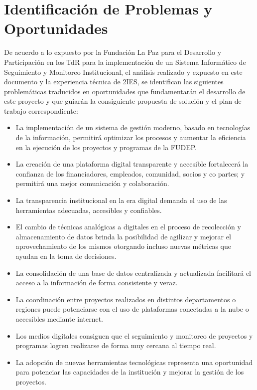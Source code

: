 \section{Identificación de Problemas y Oportunidades}

De acuerdo a lo expuesto por la Fundación La Paz para el Desarrollo y Participación en los TdR para la implementación de un Sistema Informático de Seguimiento y Monitoreo Institucional,
el análisis realizado y expuesto en este documento y la experiencia técnica de 2IES, se identifican las siguientes problemáticas traducidos en oportunidades 
que fundamentarán el desarrollo de este proyecto y que guiarán la consiguiente propuesta de solución y el plan de trabajo correspondiente:

\begin{itemize}
    \item La implementación de un sistema de gestión moderno, basado en tecnologías de la información, permitirá optimizar los procesos y aumentar la eficiencia en la ejecución de los proyectos y programas de la FUDEP.
    \item La creación de una plataforma digital transparente y accesible fortalecerá la confianza de los financiadores, empleados, comunidad, socios y co partes; y permitirá una mejor comunicación y colaboración.
    \item La transparencia institucional en la era digital demanda el uso de las herramientas adecuadas, accesibles y confiables.
    \item El cambio de técnicas analógicas a digitales en el proceso de recolección y almacenamiento de datos brinda la posibilidad de agilizar y mejorar el aprovechamiento de los mismos otorgando incluso nuevas métricas que ayudan en la toma de decisiones.
    \item La consolidación de una base de datos centralizada y actualizada facilitará el acceso a la información de forma consistente y veraz.
    \item La coordinación entre proyectos realizados en distintos departamentos o regiones puede potenciarse con el uso de plataformas conectadas a la nube o accesibles mediante internet.
    \item Los medios digitales consiguen que el seguimiento y monitoreo de proyectos y programas logren realizarse de forma muy cercana al tiempo real.
    \item La adopción de nuevas herramientas tecnológicas representa una oportunidad para potenciar las capacidades de la institución y mejorar la gestión de los proyectos.

\end{itemize}
